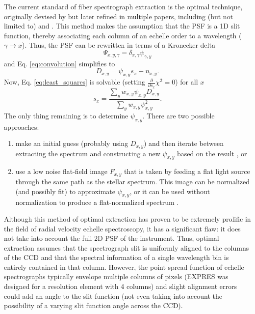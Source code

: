 \documentclass[11pt]{article}
\begin{document}
The current standard of fiber spectrograph extraction is the optimal technique, originally devised by \citet{Horne1986} but later refined in multiple papers, including (but not limited to) \citet{Piskunov2002} and \citet{Zechmeister2013}. This method makes the assumption that the PSF is a 1D slit function, thereby associating each column of an echelle order to a wavelength ($\gamma \rightarrow x$). Thus, the PSF can be rewritten in terms of a Kronecker delta
\begin{equation}
    \Psi_{x,y,\gamma} = \delta_{x,\gamma}\psi_{\gamma,y}
\label{eq:psf_optimal}
\end{equation}
and Eq. \ref{eq:convolution} simplifies to
\begin{equation}
    D_{x,y} = \psi_{x,y} s_x + n_{x,y}.
\end{equation}
Now, Eq. \ref{eq:least_squares} is solvable (setting $\frac{\partial}{\partial s_x} \chi^2 = 0$) for all $x$
\begin{equation}
    s_x = \frac{\sum_y w_{x,y} \psi_{x,y} D_{x,y}}{\sum_y w_{x,y} \psi^2_{x,y}}.
\end{equation}
The only thing remaining is to determine $\psi_{x,y}$. There are two possible approaches:
\begin{enumerate}
    \item make an initial guess (probably using $D_{x,y}$) and then iterate between extracting the spectrum and constructing a new $\psi_{x,y}$ based on the result \citep{Horne1986, Piskunov2002}, or
    \item use a low noise flat-field image $F_{x,y}$ that is taken by feeding a flat light source through the same path as the stellar spectrum. This image can be normalized (and possibly fit) to approximate $\psi_{x,y}$, or it can be used without normalization to produce a flat-normalized spectrum \citep{Zechmeister2013}.
\end{enumerate}

Although this method of optimal extraction has proven to be extremely prolific in the field of radial velocity echelle spectroscopy, it has a significant flaw: it does not take into account the full 2D PSF of the instrument. Thus, optimal extraction assumes that the spectrograph slit is uniformly aligned to the columns of the CCD and that the spectral information of a single wavelength bin is entirely contained in that column. However, the point spread function of echelle spectrographs typically envelope multiple columns of pixels (EXPRES was designed for a resolution element with 4 columns) and slight alignment errors could add an angle to the slit function (not even taking into account the possibility of a varying slit function angle across the CCD).
\end{document}
